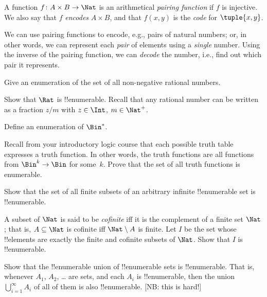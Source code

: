 \begin{defn} 
  A function $f\colon A \times B \to \Nat$ is an arithmetical
  \emph{pairing function} if $f$ is injective. We also say that $f$
  \emph{encodes} $A \times B$, and that $f(x,y)$ is the
  \emph{code} for $\tuple{x,y}$.
\end{defn}

\begin{explain}
We can use pairing functions to encode, e.g., pairs of natural numbers;
or, in other words, we can represent each \emph{pair} of elements
using a \emph{single} number. Using the inverse of the pairing
function, we can \emph{decode} the number, i.e., find out which
pair it represents.
\end{explain}

\begin{prob}
Give an enumeration of the set of all non-negative rational numbers. 
\end{prob}

\begin{prob}
Show that $\Rat$ is !!{enumerable}. Recall that any rational number 
can be written as a fraction $z/m$ with $z \in \Int$, $m \in \Nat^+$.
\end{prob}

\begin{prob}
Define an enumeration of $\Bin^*$.
\end{prob}

\begin{prob}
Recall from your introductory logic course that each possible truth
table expresses a truth function. In other words, the truth functions
are all functions from $\Bin^k \to \Bin$ for some~$k$. Prove that the
set of all truth functions is enumerable.
\end{prob}

\begin{prob}
Show that the set of all finite subsets of an arbitrary infinite
!!{enumerable} set is !!{enumerable}.
\end{prob}

\begin{prob}
A subset of $\Nat$ is said to be \emph{cofinite} iff it is the
complement of a finite set $\Nat$; that is, $A \subseteq \Nat$ is
cofinite iff $\Nat\setminus A$ is finite. Let $I$ be the set whose
!!{element}s are exactly the finite and cofinite subsets of $\Nat$.
Show that $I$ is !!{enumerable}.
\end{prob}

\begin{prob}
Show that the !!{enumerable} union of !!{enumerable} sets is
!!{enumerable}. That is, whenever $A_1$, $A_2$, \dots{} are sets, and
each $A_i$ is !!{enumerable}, then the union $\bigcup_{i=1}^\infty
A_i$ of all of them is also !!{enumerable}. [NB: this is hard!]
\end{prob}


